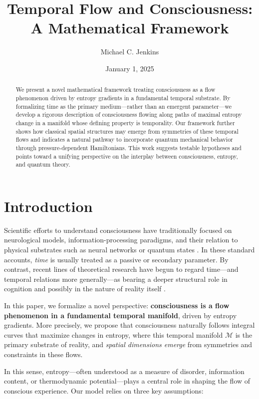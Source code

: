 \documentclass[12pt]{article}
\title{Temporal Flow and Consciousness: A Mathematical Framework}
\author{Michael C. Jenkins}
\date{January 1, 2025}
\begin{document}
\maketitle

\begin{abstract}
We present a novel mathematical framework treating consciousness as a flow phenomenon driven by entropy gradients in a fundamental temporal substrate. By formalizing time as the primary medium---rather than an emergent parameter---we develop a rigorous description of consciousness flowing along paths of maximal entropy change in a manifold whose defining property is temporality. Our framework further shows how classical spatial structures may emerge from symmetries of these temporal flows and indicates a natural pathway to incorporate quantum mechanical behavior through pressure-dependent Hamiltonians. This work suggests testable hypotheses and points toward a unifying perspective on the interplay between consciousness, entropy, and quantum theory.
\end{abstract}

\tableofcontents

\section{Introduction}
\label{sec:intro}

Scientific efforts to understand consciousness have traditionally focused on neurological models, information-processing paradigms, and their relation to physical substrates such as neural networks or quantum states \cite{penrose1994shadows,tononi2008consciousness,deutsch2011beginning}. In these standard accounts, \emph{time} is usually treated as a passive or secondary parameter. By contrast, recent lines of theoretical research have begun to regard time---and temporal relations more generally---as bearing a deeper structural role in cognition and possibly in the nature of reality itself \cite{rovelli2018order,batelaan2013time}.

In this paper, we formalize a novel perspective: \textbf{consciousness is a flow phenomenon in a fundamental temporal manifold}, driven by entropy gradients. More precisely, we propose that consciousness naturally follows integral curves that maximize changes in entropy, where this temporal manifold $\mathcal{M}$ is the primary substrate of reality, and \textit{spatial dimensions emerge} from symmetries and constraints in these flows. 

In this sense, entropy---often understood as a measure of disorder, information content, or thermodynamic potential---plays a central role in shaping the flow of conscious experience. Our model relies on three key assumptions:
\end{document}
